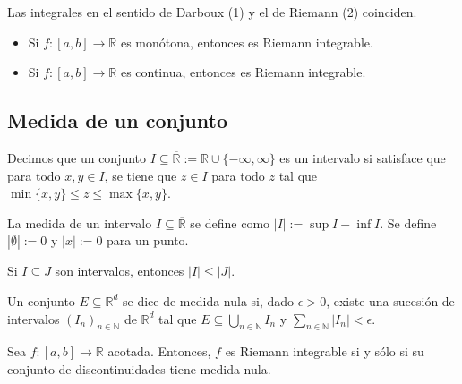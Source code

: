 \documentclass[11pt]{article}
\begin{document}
\begin{remark}
Las integrales en el sentido de Darboux (1) y el de Riemann (2) coinciden.
\end{remark}

\begin{proposition}
\begin{itemize}
    \item Si $f:[a,b] \rightarrow \mathbb{R}$ es monótona, entonces es Riemann integrable.
    \item Si $f:[a,b] \rightarrow \mathbb{R}$ es continua, entonces es Riemann integrable.
\end{itemize}
\end{proposition}

\subsection{Medida de un conjunto}
\label{sec:measure}

\begin{definition}
Decimos que un conjunto $I \subseteq \overline{\mathbb{R}} := \mathbb{R} \cup \{-\infty, \infty\}$ es un intervalo si satisface que para todo $x,y \in I$, se tiene que $z \in I$ para todo $z$ tal que $\min\{x,y\} \le z \le \max\{x,y\}$.
\end{definition}

\begin{definition}
La medida de un intervalo $I \subseteq \overline{\mathbb{R}}$ se define como $|I| := \sup I - \inf I$. Se define $|\emptyset|:=0$ y $|x|:=0$ para un punto.
\end{definition}

\begin{property}
Si $I \subseteq J$ son intervalos, entonces $|I| \le |J|$.
\end{property}

\begin{definition}
Un conjunto $E \subseteq \mathbb{R}^d$ se dice de medida nula si, dado $\epsilon > 0$, existe una sucesión de intervalos $(I_n)_{n \in \mathbb{N}}$ de $\mathbb{R}^d$ tal que $E \subseteq \bigcup_{n \in \mathbb{N}} I_n$ y $\sum_{n \in \mathbb{N}} |I_n| < \epsilon$.
\end{definition}

\begin{theorem}
Sea $f:[a,b] \rightarrow \mathbb{R}$ acotada. Entonces, $f$ es Riemann integrable si y sólo si su conjunto de discontinuidades tiene medida nula.
\end{theorem}
\end{document}
